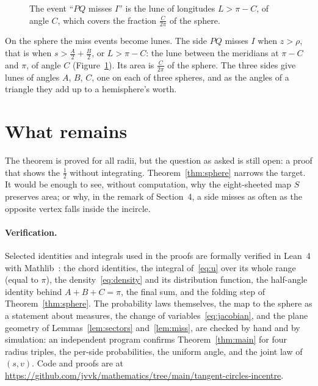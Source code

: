 \documentclass[11pt]{article}
\theoremstyle{remark}
\begin{document}
\begin{figure}[ht]
\centering
{}
\caption{The event ``$PQ$ misses $I$'' is the lune of longitudes $L>\pi-C$, of angle $C$, which
covers the fraction $\frac{C}{2\pi}$ of the sphere.}
\label{fig:lune}
\end{figure}

On the sphere the miss events become lunes. The side $PQ$ misses $I$ when $z>\rho$, that is when
$s>\frac A2+\frac B2$, or $L>\pi-C$: the lune between the meridians at $\pi-C$ and $\pi$, of angle $C$
(Figure~\ref{fig:lune}). Its area is $\frac{C}{2\pi}$ of the sphere. The three sides give lunes of
angles $A$, $B$, $C$, one on each of three spheres, and as the angles of a triangle they add up to a
hemisphere's worth.

\section{What remains}

The theorem is proved for all radii, but the question as asked is still open: a proof that shows
the $\frac12$ without integrating. Theorem~\ref{thm:sphere} narrows the target. It would be enough to
see, without computation, why the eight-sheeted map $S$ preserves area; or why, in the remark of
Section~4, a side misses as often as the opposite vertex falls inside the incircle.

\paragraph{Verification.} Selected identities and integrals used in the proofs are formally verified in
Lean~4 with Mathlib~\cite{mathlib}: the chord identities, the integral of~\eqref{eq:u} over its whole range
(equal to $\pi$), the density~\eqref{eq:density} and its distribution function, the half-angle
identity behind $A+B+C=\pi$, the final sum, and the folding step of Theorem~\ref{thm:sphere}. The
probability laws themselves, the map to the sphere as a statement about measures, the
change of variables~\eqref{eq:jacobian}, and the plane geometry of
Lemmas~\ref{lem:sectors} and~\ref{lem:miss}, are checked by hand and by simulation: an independent
program confirms Theorem~\ref{thm:main} for four radius triples, the per-side probabilities, the
uniform angle, and the joint law of $(s,v)$. Code and proofs are at
\url{https://github.com/jvvk/mathematics/tree/main/tangent-circles-incentre}.
\end{document}
